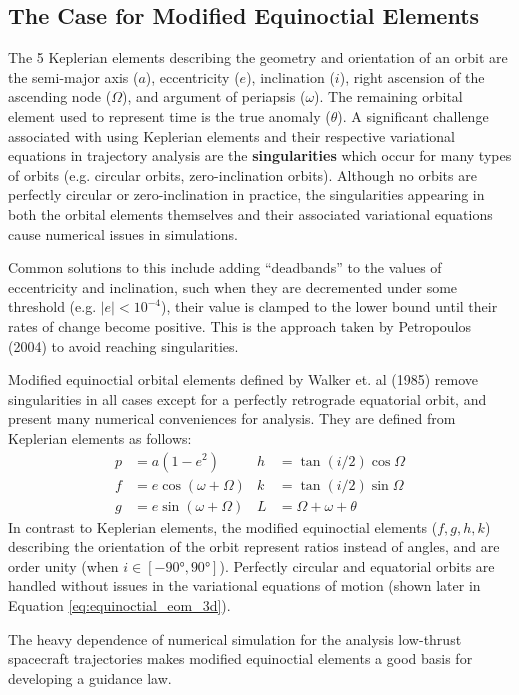 \subsection{The Case for Modified Equinoctial Elements}
The 5 Keplerian elements describing the geometry and orientation of an orbit are the semi-major axis ($a$), eccentricity ($e$), inclination ($i$), right ascension of the ascending node ($\Omega$), and argument of periapsis ($\omega$). The remaining orbital element used to represent time is the true anomaly ($\theta$). A significant challenge associated with using Keplerian elements and their respective variational equations in trajectory analysis are the \textbf{singularities} which occur for many types of orbits (e.g. circular orbits, zero-inclination orbits). Although no orbits are perfectly circular or zero-inclination in practice, the singularities appearing in both the orbital elements themselves and their associated variational equations cause numerical issues in simulations.

Common solutions to this include adding ``deadbands'' to the values of eccentricity and inclination, such when they are decremented under some threshold (e.g. $|e| < 10^{-4}$), their value is clamped to the lower bound until their rates of change become positive. This is the approach taken by Petropoulos (2004) \cite{petropoulos2004low} to avoid reaching singularities.

Modified equinoctial orbital elements defined by Walker et. al (1985) \cite{walker1985set} remove singularities in all cases except for a perfectly retrograde equatorial orbit, and present many numerical conveniences for analysis. They are defined from Keplerian elements as follows:
\begin{align*}
  p & = a \left(1-e^2\right)    & h & = \tan(i/2) \cos \Omega    \\
  f & = e \cos(\omega + \Omega) & k & = \tan(i/2) \sin \Omega    \\
  g & = e \sin(\omega + \Omega) & L & = \Omega + \omega + \theta
\end{align*}
In contrast to Keplerian elements, the modified equinoctial elements ($f, g, h, k$) describing the orientation of the orbit represent ratios instead of angles, and are order unity (when $i \in [-\ang{90}, \ang{90}]$). Perfectly circular and equatorial orbits are handled without issues in the variational equations of motion (shown later in Equation \ref{eq:equinoctial_eom_3d}).

The heavy dependence of numerical simulation for the analysis low-thrust spacecraft trajectories makes modified equinoctial elements a good basis for developing a guidance law.

